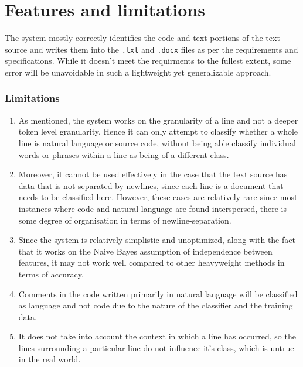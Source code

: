 \documentclass[12pt]{scrreprt}
\begin{document}



\section{Features and limitations}
The system mostly correctly identifies the code and text portions of the text source and writes them into the \texttt{.txt} and \texttt{.docx} files as per the requirements and specifications. While it doesn't meet the requirments to the fullest extent, some error will be unavoidable in such a lightweight yet generalizable approach. 

\subsubsection{Limitations}

\begin{enumerate}
    \item As mentioned, the system works on the granularity of a line and not a deeper token level granularity. Hence it can only attempt to classify whether a whole line is natural language or source code, without being able classify individual words or phrases within a line as being of a different class.
    \item Moreover, it cannot be used effectively in the case that the text source has data that is not separated by newlines, since each line is a document that needs to be classified here. However, these cases are relatively rare since most instances where code and natural language are found interspersed, there is some degree of organisation in terms of newline-separation.
    \item Since the system is relatively simplistic and unoptimized, along with the fact that it works on the Naive Bayes assumption of independence between features, it may not work well compared to other heavyweight methods in terms of accuracy. 
    \item Comments in the code written primarily in natural language will be classified as language and not code due to the nature of the classifier and the training data.
    \item It does not take into account the context in which a line has occurred, so the lines surrounding a particular line do not influence it's class, which is untrue in the real world.
\end{enumerate}
\end{document}
